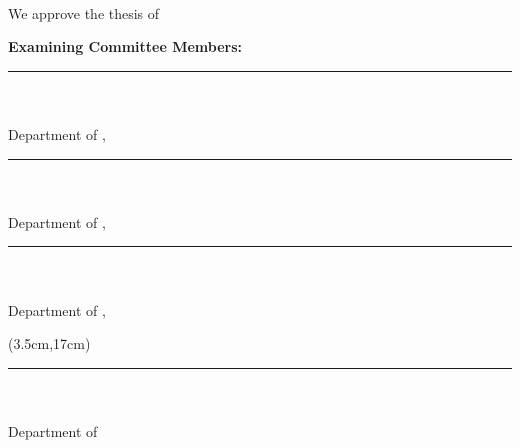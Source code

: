~\pagebreak

\thispagestyle{empty}

\begin{spacing}{1}
	\noindent We approve the thesis of
	\textbf{\AuthorName{ }\MakeUppercase\AuthorSurname}
	\vspace{0.5cm}

	\noindent\textbf{Examining Committee Members:}
	\vspace{0.5cm}

	\noindent\rule{5cm}{0.1mm}\\
	\textbf{\CommitteeMemberOneTitle{ }\CommitteeMemberOneName{}
	\MakeUppercase\CommitteeMemberOneSurname}\\
	Department of \CommitteeMemberOneDepartment, \CommitteeMemberOneUniversity
	\vspace{0.5cm}

	\noindent\rule{5cm}{0.1mm}\\
	\textbf{\CommitteeMemberTwoTitle{ }\CommitteeMemberTwoName{}
	\MakeUppercase\CommitteeMemberTwoSurname}\\
	Department of \CommitteeMemberTwoDepartment, \CommitteeMemberTwoUniversity
	\vspace{0.5cm}

	\noindent\rule{5cm}{0.1mm}\\
	\textbf{\CommitteeMemberThreeTitle{ }\CommitteeMemberThreeName{}
	\MakeUppercase\CommitteeMemberThreeSurname}\\
	Department of \CommitteeMemberThreeDepartment, \CommitteeMemberThreeUniversity
	\vspace{0.5cm}



	\begin{textblock*}{\textwidth}(3.5cm,17cm)
		\noindent\rule{5cm}{0.1mm}\\
		\textbf{\SupervisorTitle{ }\SupervisorName{}
		\MakeUppercase\SupervisorSurname}\\
		Department of \SupervisorDepartment\\
		\SupervisorUniversity
	\end{textblock*}


\end{spacing}

